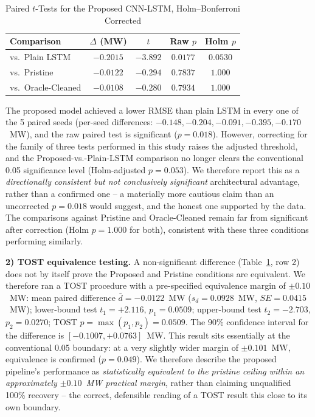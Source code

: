 \documentclass[conference]{IEEEtran}
\begin{document}
\begin{table}[H]
\centering
\caption{Paired $t$-Tests for the Proposed CNN-LSTM, Holm--Bonferroni Corrected}
\label{tab:stats}
\footnotesize
\begin{tabular}{@{}lcccc@{}}
\toprule
\textbf{Comparison} & \textbf{$\Delta$ (MW)} & \textbf{$t$} & \textbf{Raw $p$} & \textbf{Holm $p$} \\
\midrule
vs.\ Plain LSTM   & $-0.2015$ & $-3.892$ & $0.0177$ & $0.0530$ \\
vs.\ Pristine     & $-0.0122$ & $-0.294$ & $0.7837$ & $1.000$ \\
vs.\ Oracle-Cleaned & $-0.0108$ & $-0.280$ & $0.7934$ & $1.000$ \\
\bottomrule
\end{tabular}
\end{table}

The proposed model achieved a lower RMSE than plain LSTM in every one of the 5 paired seeds (per-seed differences: $-0.148, -0.204, -0.091, -0.395, -0.170$~MW), and the raw paired test is significant ($p=0.018$). However, correcting for the family of three tests performed in this study raises the adjusted threshold, and the Proposed-vs.-Plain-LSTM comparison no longer clears the conventional 0.05 significance level (Holm-adjusted $p=0.053$). We therefore report this as a \emph{directionally consistent but not conclusively significant} architectural advantage, rather than a confirmed one -- a materially more cautious claim than an uncorrected $p=0.018$ would suggest, and the honest one supported by the data. The comparisons against Pristine and Oracle-Cleaned remain far from significant after correction (Holm $p=1.000$ for both), consistent with these three conditions performing similarly.

\textbf{2) TOST equivalence testing.} A non-significant difference (Table~\ref{tab:stats}, row 2) does not by itself prove the Proposed and Pristine conditions are equivalent. We therefore ran a TOST procedure with a pre-specified equivalence margin of $\pm 0.10$~MW: mean paired difference $\bar{d} = -0.0122$~MW ($s_d = 0.0928$~MW, $SE = 0.0415$~MW); lower-bound test $t_1 = +2.116$, $p_1 = 0.0509$; upper-bound test $t_2 = -2.703$, $p_2 = 0.0270$; TOST $p = \max(p_1,p_2) = 0.0509$. The 90\% confidence interval for the difference is $[-0.1007, +0.0763]$~MW. This result sits essentially at the conventional 0.05 boundary: at a very slightly wider margin of $\pm 0.101$~MW, equivalence is confirmed ($p=0.049$). We therefore describe the proposed pipeline's performance as \emph{statistically equivalent to the pristine ceiling within an approximately $\pm 0.10$~MW practical margin}, rather than claiming unqualified 100\% recovery -- the correct, defensible reading of a TOST result this close to its own boundary.
\end{document}

